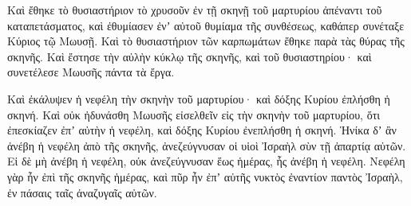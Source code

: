 {Καὶ ἔθηκε τὸ θυσιαστήριον τὸ χρυσοῦν ἐν τῇ σκηνῇ τοῦ μαρτυρίου ἀπέναντι τοῦ καταπετάσματος,
καὶ ἐθυμίασεν ἐνʼ αὐτοῦ θυμίαμα τῆς συνθέσεως, καθάπερ συνέταξε Κύριος τῷ Μωυσῇ.
Καὶ τὸ θυσιαστήριον τῶν καρπωμάτων ἔθηκε παρὰ τὰς θύρας τῆς σκηνῆς.
Καὶ ἔστησε τὴν αὐλὴν κύκλῳ τῆς σκηνῆς, καὶ τοῦ θυσιαστηρίου· καὶ συνετέλεσε Μωυσῆς πάντα τὰ ἔργα.
\par }{\PP {}Καὶ ἐκάλυψεν ἡ νεφέλη τὴν σκηνὴν τοῦ μαρτυρίου· καὶ δόξης Κυρίου ἐπλήσθη ἡ σκηνή.
Καὶ οὐκ ἠδυνάσθη Μωυσῆς εἰσελθεῖν εἰς τὴν σκηνὴν τοῦ μαρτυρίου, ὅτι ἐπεσκίαζεν ἐπʼ αὐτὴν ἡ νεφέλη, καὶ δόξης Κυρίου ἐνεπλήσθη ἡ σκηνή.
Ἡνίκα δʼ ἂν ἀνέβη ἡ νεφέλη ἀπὸ τῆς σκηνῆς, ἀνεζεύγνυσαν οἱ υἱοὶ Ἰσραὴλ σὺν τῇ ἀπαρτίᾳ αὐτῶν.
Εἰ δὲ μὴ ἀνέβη ἡ νεφέλη, οὐκ ἀνεζεύγνυσαν ἕως ἡμέρας, ἧς ἀνέβη ἡ νεφέλη.
Νεφέλη γὰρ ἦν ἐπὶ τῆς σκηνῆς ἡμέρας, καὶ πῦρ ἦν ἐπʼ αὐτῆς νυκτὸς ἐναντίον παντὸς Ἰσραὴλ, ἐν πάσαις ταῖς ἀναζυγαῖς αὐτῶν.
\par }